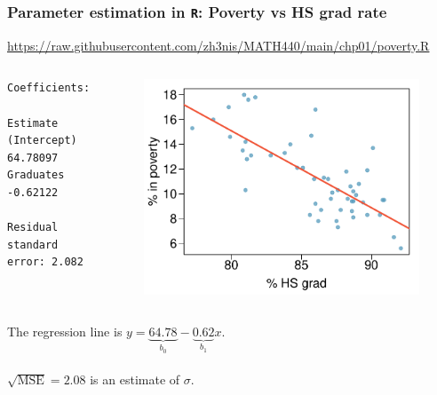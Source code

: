\documentclass{beamer}
\begin{document}
\begin{frame}[fragile]
\frametitle{Parameter estimation in \texttt{R}: Poverty vs HS grad rate}
{\color{blue} \url{https://raw.githubusercontent.com/zh3nis/MATH440/main/chp01/poverty.R}}
\begin{columns}
\begin{column}{.5\textwidth}
\begin{small}
\begin{verbatim}
Coefficients:
            Estimate     
(Intercept) 64.78097 
Graduates   -0.62122 

Residual standard error: 2.082
\end{verbatim}    
\end{small}
\end{column}
\begin{column}{.5\textwidth}
\begin{figure}
    \centering
    \includegraphics[width=\textwidth]{plots/poverty_hsgrad_line.pdf}
\end{figure}
\end{column}
\end{columns}

\vfill
\pause 
The regression line is $y=\underbrace{64.78}_{b_0}-\underbrace{0.62}_{b_1}x$.\\~\\
$\sqrt{\mathrm{MSE}}=2.08$ is an estimate of $\sigma$.
\end{frame}
\end{document}
